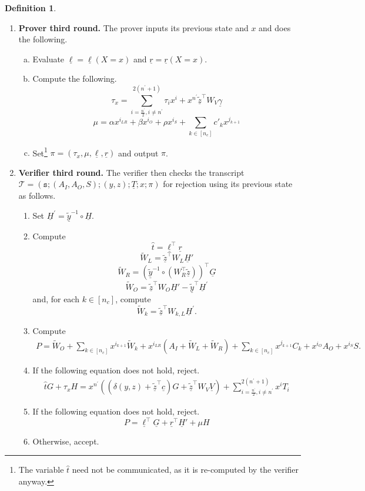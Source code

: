 \documentclass{article}
\theoremstyle{definition}
\newtheorem{definition}[theorem]{Definition}
\newcommand{\zq}{\widetilde{\underline{z}}}
\newcommand{\yq}{\widetilde{\underline{y}}}
\begin{document}
\begin{definition}
\begin{enumerate}
\item \textbf{Prover third round.} The prover inputs its previous state and $x$ and  does the following.
\begin{enumerate}[(a)]
	\item Evaluate $\underline{\ell} = \underline{\ell}(X=x)$ and $\underline{r} = \underline{r}(X=x)$.
    \item Compute the following.
	$$\tau_x = \sum_{i=\frac{n^\prime}{2}, i \neq n^\prime}^{2(n^\prime + 1)} \tau_i x^i + x^{n^\prime} \zq^\top W_V \underline{\gamma}$$
	$$\mu = \alpha x^{i_{LR}} + \beta x^{i_O} + \rho x^{i_S} + \sum_{k \in [n_c]} c'_k x^{j_{k+1}}$$
	\item Set\footnote{The variable $\widehat{t}$ need not be communicated, as it is re-computed by the verifier anyway.} $\pi = (\tau_x, \mu, \underline{\ell}, \underline{r})$ and output $\pi$.
\end{enumerate}
\item \textbf{Verifier third round.} The verifier then checks the transcript $\mathcal{T} = (\texttt{s}; (A_I, A_O, S); (y, z); \underline{T}; x; \pi)$ for rejection using its previous state as follows.
\begin{enumerate}
	\item Set $\underline{H}^\prime = \yq^{-1} \circ \underline{H}$.
	\item Compute 
    $$\widehat{t} = \underline{\ell}^\top\underline{r}$$
	$$\widetilde{W}_L = \zq^\top W_L \underline{H}'$$
	$$\widetilde{W}_R = \left(\yq^{-1} \circ \left(W_R^\top \zq\right)\right)^\top\underline{G}$$
	$$\widetilde{W}_O =  \zq^\top W_O  \underline{H}' - \yq^\top \underline{H}^\prime$$
    and, for each $k \in [n_c]$, compute 
	$$\widetilde{W}_{k} = \zq^\top W_{k,L} \underline{H}^\prime.$$
	\item 
    \label{compute-p} Compute 
	\begin{multline*}
		P\!=\!\widetilde{W}_O\!+\!\sum_{k\!\in\![n_c]}\!x^{i_{k+1}}\!\widetilde{W}_k\!+\!x^{i_{LR}}\!(\!A_I\!+\!\widetilde{W}_L\!+\!\widetilde{W}_R\!)\!+\!\sum_{k\!\in\! [n_c]}\!x^{j_{k\!+\!1}}\!C_k\!+\!x^{i_O}\!A_O\!+\!x^{i_S}\!S.
	\end{multline*}
    
	\item If the following equation does not hold, reject.
	\begin{multline}
		\label{eqn:verifyT}
		\widehat{t} G + \tau_x H = 
		x^{n^\prime}\left(\left( \delta(y, z) + \zq^\top\underline{c}  \right)G +  \zq^\top  W_V \underline{V}\right) + \sum_{i=\frac{n^\prime}{2}, i \neq n^\prime}^{2(n^\prime + 1)} x^i T_i
	\end{multline}
	\item If the following equation does not hold, reject.
	\begin{equation}
		\label{eqn:verifyP}
		P = \underline{\ell}^\top \underline{G} + \underline{r}^\top \underline{H}' + \mu H
	\end{equation}
	\item Otherwise, accept.
\end{enumerate}
\end{enumerate}
\label{def:theprotocol}
\end{definition}
\end{document}
